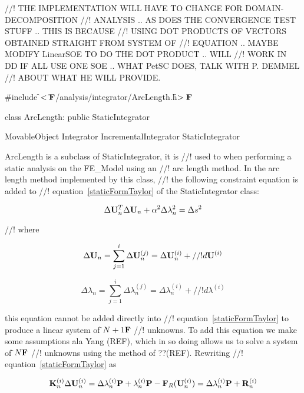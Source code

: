 
//! THE IMPLEMENTATION WILL HAVE TO CHANGE FOR DOMAIN-DECOMPOSITION
//! ANALYSIS .. AS DOES THE CONVERGENCE TEST STUFF .. THIS IS BECAUSE
//! USING DOT PRODUCTS OF VECTORS OBTAINED STRAIGHT FROM SYSTEM OF
//! EQUATION .. MAYBE MODIFY LinearSOE TO DO THE DOT PRODUCT .. WILL 
//! WORK IN DD IF ALL USE ONE SOE .. WHAT PetSC DOES, TALK WITH P. DEMMEL
//! ABOUT WHAT HE WILL PROVIDE.

\indent \#include \f$<\tilde{ }{\bf F}$/analysis/integrator/ArcLength.h\f$>{\bf F}$

\indent class ArcLength: public StaticIntegrator

\indent MovableObject
\indent\indent Integrator
\indent\indent\indent IncrementalIntegrator
\indent\indent\indent\indent StaticIntegrator
\indent\indent\indent\indent{}

\indent ArcLength is a subclass of StaticIntegrator, it is
//! used to when performing a static analysis on the FE\_Model using an
//! arc length method. In the arc length method implemented by this class,
//! the following constraint equation is added to
//! equation~\ref{staticFormTaylor} of the StaticIntegrator class: 

\begin{equation}
\Delta {\bf U}_n^T \Delta {\bf U}_n  + \alpha^2 \Delta \lambda_n^2  = \Delta s^2
\end{equation}

//! where 

\[
\Delta {\bf U}_n = \sum_{j=1}^{i} \Delta {\bf U}_n^{(j)} = \Delta {\bf U}_n^{(i)} +
//! d{\bf U}^{(i)} 
\]

\[
\Delta \lambda_n = \sum_{j=1}^{i} \Delta \lambda_n^{(j)} = \Delta \lambda_n^{(i)} +
//! d\lambda^{(i)} 
\]

\noindent this equation cannot be added directly into
//! equation~\ref{staticFormTaylor} to produce a linear system of \f$N+1{\bf F}$
//! unknowns. To add this equation we make some assumptions ala Yang
(REF), which in so doing allows us to solve a system of \f$N{\bf F}$
//! unknowns using the method of ??(REF).  Rewriting
//! equation~\ref{staticFormTaylor} as  

\[
{\bf K}_n^{(i)} \Delta {\bf U}_n^{(i)} = \Delta \lambda_n^{(i)} {\bf P} +
\lambda_n^{(i)} {\bf P} - {\bf F}_R({\bf U}_n^{(i)}) = \Delta \lambda_n^{(i)} {\bf P} + {\bf R}_n^{(i)}
\]

